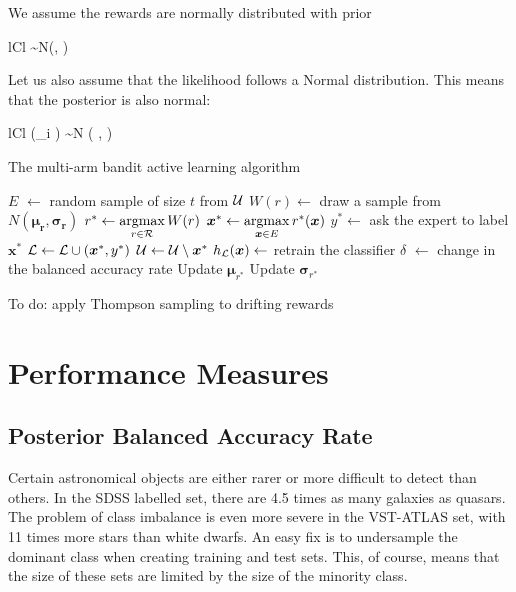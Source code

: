 We assume the rewards are normally distributed with prior
	\begin{IEEEeqnarray*}{lCl}
		 \sim N(\bm{\mu}, \sigma {})
	\end{IEEEeqnarray*}
Let us also assume that the likelihood follows a Normal distribution. This means
that the posterior is also normal:
	\begin{IEEEeqnarray*}{lCl}
		(_i \mid \bm{\tau}) \sim N \left(
			,
			\right)
	\end{IEEEeqnarray*}

\begin{algorithm}[tbp]
	\caption{The multi-arm bandit active learning algorithm}
	\label{alg:bandit}
	\begin{algorithmic}[1]
		\State $E$ $\leftarrow$ random sample of size $t$ from $\mathcal{U}$
			\State $W(r) \leftarrow$ draw a sample from $N(\bm{\mu_r}, \bm{\sigma_r})$
		\Endforeach
		\State $r^* \leftarrow \argmax_{r \in \R} W(r)$
		\State $\bm{x}^* \leftarrow \argmax_{\bm{x} \in E} r^*(\bm{x})$
		\State $y^* \leftarrow$ ask the expert to label $\bm{x}^*$
		\State $\mathcal{L} \leftarrow \mathcal{L}  \cup (\bm{x}^*, y^*)$
		\State $\mathcal{U} \leftarrow \mathcal{U} \setminus \bm{x}^*$
		\State $h_{\mathcal{L}}(\bm{x}) \leftarrow$ retrain the classifier
		\State $\delta$ $\leftarrow$ change in the balanced accuracy rate 
		\State Update $\bm{\mu}_{r^*}$
		\State Update $\bm{\sigma}_{r^*}$
		\EndWhile
		\EndProcedure
	\end{algorithmic}
\end{algorithm}


To do: apply Thompson sampling to drifting rewards \cite{gupta11}


\section{Performance Measures}
\label{sec:measures}

\subsection{Posterior Balanced Accuracy Rate}
Certain astronomical objects are either rarer or more difficult to detect than others.
In the SDSS labelled set, there are 4.5 times as many galaxies as quasars. The problem
of class imbalance is even more severe in the VST-ATLAS set, with 11 times more stars than
white dwarfs. An easy fix is to undersample the dominant class when creating training and
test sets. This, of course, means that the size of these sets are limited by the size
of the minority class.

